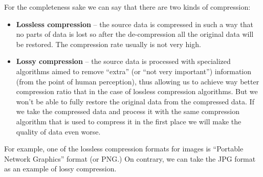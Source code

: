 \documentclass[../sparc.tex]{subfiles}
\begin{document}
For the completeness sake we can say that there are two kinds of compression:
\begin{itemize}
\item \textbf{Lossless compression} -- the source data is compressed in such a
  way that no parts of data is lost so after the de-compression all the original
  data will be restored.  The compression rate usually is not very high.
\item \textbf{Lossy compression} -- the source data is processed with specialized
  algorithms aimed to remove ``extra'' (or ``not very important'') information
  (from the point of human perception), thus allowing us to achieve way better
  compression ratio that in the case of lossless compression algorithms.  But we
  won't be able to fully restore the original data from the compressed data.  If
  we take the compressed data and process it with the same compression algorithm
  that is used to compress it in the first place we will make the quality of
  data even worse.
\end{itemize}

For example, one of the lossless compression formats for images is ``Portable
Network Graphics'' format (or PNG.)  On contrary, we can take the JPG format as
an example of lossy compression.
\end{document}
